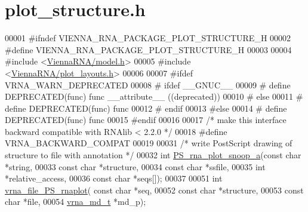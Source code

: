 \hypertarget{plot__structure_8h_source}{}\section{plot\+\_\+structure.\+h}
\label{plot__structure_8h_source}

\begin{DoxyCode}
00001 \textcolor{preprocessor}{#ifndef VIENNA\_RNA\_PACKAGE\_PLOT\_STRUCTURE\_H}
00002 \textcolor{preprocessor}{#define VIENNA\_RNA\_PACKAGE\_PLOT\_STRUCTURE\_H}
00003 
00004 \textcolor{preprocessor}{#include <\hyperlink{model_8h}{ViennaRNA/model.h}>}
00005 \textcolor{preprocessor}{#include <\hyperlink{plot__layouts_8h}{ViennaRNA/plot\_layouts.h}>}
00006 
00007 \textcolor{preprocessor}{#ifdef VRNA\_WARN\_DEPRECATED}
00008 \textcolor{preprocessor}{# ifdef \_\_GNUC\_\_}
00009 \textcolor{preprocessor}{#  define DEPRECATED(func) func \_\_attribute\_\_ ((deprecated))}
00010 \textcolor{preprocessor}{# else}
00011 \textcolor{preprocessor}{#  define DEPRECATED(func) func}
00012 \textcolor{preprocessor}{# endif}
00013 \textcolor{preprocessor}{#else}
00014 \textcolor{preprocessor}{# define DEPRECATED(func) func}
00015 \textcolor{preprocessor}{#endif}
00016 
00017 \textcolor{comment}{/* make this interface backward compatible with RNAlib < 2.2.0 */}
00018 \textcolor{preprocessor}{#define VRNA\_BACKWARD\_COMPAT}
00019 
00031 \textcolor{comment}{/* write PostScript drawing of structure to file with annotation */}
00032 \textcolor{keywordtype}{int} \hyperlink{plot__structure_8h_a6d0abe209468084b5a24c837e2d222a6}{PS\_rna\_plot\_snoop\_a}(\textcolor{keyword}{const} \textcolor{keywordtype}{char} *\textcolor{keywordtype}{string},
00033                         \textcolor{keyword}{const} \textcolor{keywordtype}{char} *structure,
00034                         \textcolor{keyword}{const} \textcolor{keywordtype}{char} *ssfile,
00035                         \textcolor{keywordtype}{int} *relative\_access,
00036                         \textcolor{keyword}{const} \textcolor{keywordtype}{char} *seqs[]);
00037 
00051 \textcolor{keywordtype}{int} \hyperlink{plot__structure_8h_abdc8f6548ba4a3bc3cd868ccbcfdb86a}{vrna\_file\_PS\_rnaplot}( \textcolor{keyword}{const} \textcolor{keywordtype}{char} *seq,
00052                           \textcolor{keyword}{const} \textcolor{keywordtype}{char} *structure,
00053                           \textcolor{keyword}{const} \textcolor{keywordtype}{char} *file,
00054                           \hyperlink{group__model__details_structvrna__md__s}{vrna\_md\_t}  *md\_p);

\end{DoxyCode}
